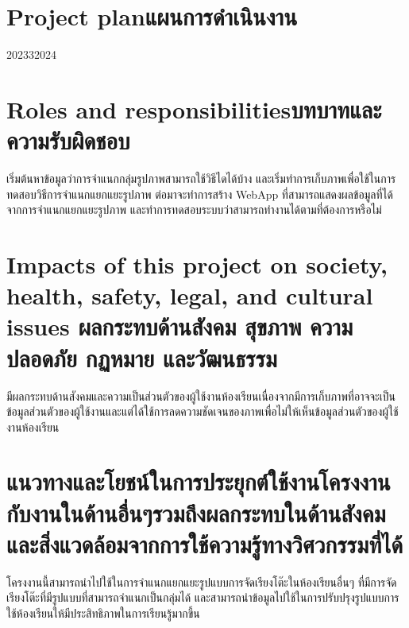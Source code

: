 \section{\ifenglish Project plan\else แผนการดำเนินงาน\fi}

\begin{plan}{6}{2023}{3}{2024}
\end{plan}

\section{\ifenglish Roles and responsibilities\else บทบาทและความรับผิดชอบ\fi}
เริ่มต้นหาข้อมูลว่าการจำแนกกลุ่มรูปภาพสามารถใช้วิธีไดได้บ้าง
\enskip และเริ่มทำการเก็บภาพเพื่อใช้ในการทดสอบวิธีการจำแนกแยกแยะรูปภาพ
\enskip ต่อมาจะทำการสร้าง WebApp ที่สามารถแสดงผลข้อมูลที่ได้จากการจำแนกแยกแยะรูปภาพ และทำการทดสอบระบบว่าสามารถทำงานได้ตามที่ต้องการหรือไม่

\section{\ifenglish%
Impacts of this project on society, health, safety, legal, and cultural issues
\else%
ผลกระทบด้านสังคม สุขภาพ ความปลอดภัย กฏหมาย และวัฒนธรรม
\fi}
มีผลกระทบด้านสังคมและความเป็นส่วนตัวของผู้ใช้งานห้องเรียนเนื่องจากมีการเก็บภาพที่อาจจะเป็นข้อมูลส่วนตัวของผู้ใช้งานและแต่ได้ใช้การลดความชัดเจนของภาพเพื่อไม่ให้เห็นข้อมูลส่วนตัวของผู้ใช้งานห้องเรียน
\section{แนวทางและโยชน์ในการประยุกต์ใช้งานโครงงานกับงานในด้านอื่นๆรวมถึงผลกระทบในด้านสังคมและสิ่งแวดล้อมจากการใช้ความรู้ทางวิศวกรรมที่ได้}
โครงงานนี้สามารถนำไปใช้ในการจำแนกแยกแยะรูปแบบการจัดเรียงโต๊ะในห้องเรียนอื่นๆ ที่มีการจัดเรียงโต๊ะที่มีรูปแบบที่สามารถจำแนกเป็นกลุ่มได้
\enskip และสามารถนำข้อมูลไปใช้ในการปรับปรุงรูปแบบการใช้ห้องเรียนให้มีประสิทธิภาพในการเรียนรู้มากขึ้น
